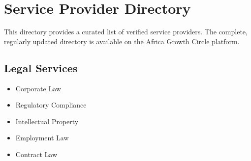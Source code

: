 
\chapter{Service Provider Directory}

\begin{importantbox}
    This directory provides a curated list of verified service providers. The complete, regularly updated directory is available on the Africa Growth Circle platform.
\end{importantbox}


\section{Legal Services}
\begin{tcolorbox}[colback=white,colframe=primarydark,title=\textbf{Legal Service Categories}]
    \begin{itemize}
        \item Corporate Law
        \item Regulatory Compliance
        \item Intellectual Property
        \item Employment Law
        \item Contract Law
    \end{itemize}
\end{tcolorbox}